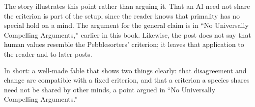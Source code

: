 \begin{afterword}
The story illustrates this point rather than arguing it. That an AI need not share the criterion is part of the setup, since the reader knows that primality has no special hold on a mind. The argument for the general claim is in ``No Universally Compelling Arguments,'' earlier in this book. Likewise, the post does not say that human values resemble the Pebblesorters' criterion; it leaves that application to the reader and to later posts.

In short: a well-made fable that shows two things clearly: that disagreement and change are compatible with a fixed criterion, and that a criterion a species shares need not be shared by other minds, a point argued in ``No Universally Compelling Arguments.''
\end{afterword}
